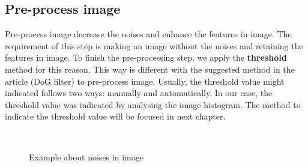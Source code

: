 \subsection{Pre-process image}
Pre-process image decrease the noises and enhance the features in image. The requirement of this step is making an image without the noises and retaining the features in image. To finish the pre-processing step, we apply the \textbf{threshold} method for this reason. This way is different with the suggested method in the article\cite{palaniswamy2010automatic} (DoG filter) to pre-process image. Usually, the threshold value might indicated follows two ways: manually and automatically. In our case, the threshold value was indicated by analysing the image histogram. The method to indicate the threshold value will be focused in next chapter.
\begin{figure}[h!]
\centering
{}~~
\caption{Example about noises in image}
\label{fig:figure_21}
\end{figure}
